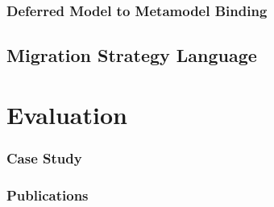 \documentclass[a4paper]{book}
\begin{document}
\subsection{Deferred Model to Metamodel Binding}
\section{Migration Strategy Language}

\chapter{Evaluation}
\subsection{Case Study}
\subsection{Publications}
\end{document}

